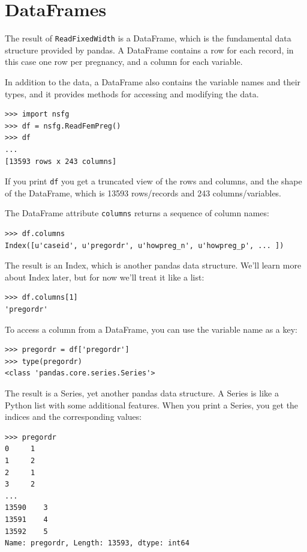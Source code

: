 \documentclass[12pt]{book}
\begin{document}
\section{DataFrames}
\label{dataframe}

The result of {\tt ReadFixedWidth} is a DataFrame, which is the
fundamental data structure provided by pandas.  A DataFrame contains a
row for each record, in this case one row per pregnancy, and a column
for each variable.

In addition to the data, a DataFrame also contains the variable
names and their types, and it provides methods for accessing and modifying
the data.

\begin{verbatim}
>>> import nsfg
>>> df = nsfg.ReadFemPreg()
>>> df
...
[13593 rows x 243 columns]
\end{verbatim}

If you print {\tt df} you get a truncated view of the rows and
columns, and the shape of the DataFrame, which is 13593
rows/records and 243 columns/variables.

The DataFrame attribute {\tt columns} returns a sequence of column
names:

\begin{verbatim}
>>> df.columns
Index([u'caseid', u'pregordr', u'howpreg_n', u'howpreg_p', ... ])
\end{verbatim}

The result is an Index, which is another pandas data structure.  
We'll learn more about Index later, but for
now we'll treat it like a list:

\begin{verbatim}
>>> df.columns[1]
'pregordr'
\end{verbatim}

To access a column from a DataFrame, you can use the variable
name as a key:

\begin{verbatim}
>>> pregordr = df['pregordr']
>>> type(pregordr)
<class 'pandas.core.series.Series'>
\end{verbatim}

The result is a Series, yet another pandas data structure.
A Series is like a Python list with some additional features.
When you print a Series, you get the indices and the
corresponding values:

\begin{verbatim}
>>> pregordr
0     1
1     2
2     1
3     2
...
13590    3
13591    4
13592    5
Name: pregordr, Length: 13593, dtype: int64
\end{verbatim}
\end{document}
